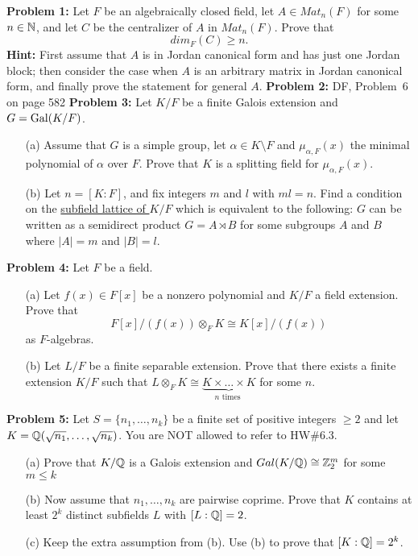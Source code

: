 \documentclass[12pt]{article}
\begin{document}
\skv
{\bf Problem 1:} Let $F$ be an algebraically closed field, let $A\in Mat_n (F)$
for some $n\in{\mathbb N}$, and let $C$ be the centralizer of $A$ in $Mat_n (F)$.
Prove that $$dim_F(C)\geq n.$$ {\bf Hint:} First assume that $A$ is in Jordan
canonical form and has just one Jordan block; then consider the case when
$A$ is an arbitrary matrix in Jordan canonical form, and finally prove
the statement for general $A$.
\skv
{\bf Problem 2:} DF, Problem~6 on page 582
\skv
{\bf Problem 3:} Let $K/F$ be a finite Galois extension and $G={\rm Gal}(K/F)$.
\begin{itemize}
\item[(a)] Assume  that $G$ is a simple group, let $\alpha\in K\setminus F$
and $\mu_{\alpha,F}(x)$ the minimal polynomial of $\alpha$ over $F$.
Prove that $K$ is a splitting field for $\mu_{\alpha,F}(x)$.

\item[(b)] Let $n=[K:F]$, and fix integers $m$ and $l$ with $ml=n$.
Find a condition on the \underline{subfield lattice of $K/F$} which is equivalent
to the following: $G$ can be written as a semidirect product $G=A\rtimes B$
for some subgroups $A$ and $B$ where $|A|=m$ and $|B|=l$.
\end{itemize}
\newpage
{\bf Problem 4:} Let $F$ be a field.
\begin{itemize}
\item[(a)] Let $f(x)\in F[x]$ be a nonzero polynomial and $K/F$ a field extension.
Prove that $$F[x]/(f(x))\otimes_F K\cong K[x]/(f(x))$$ as $F$-algebras.
\item[(b)] Let $L/F$ be a finite separable extension. Prove that
there exists a finite extension $K/F$ such that 
$L\otimes_F K\cong \underbrace{K\times\ldots\times K}_{n \mbox{ times }}$
for some $n$.
\end{itemize}
\skv
{\bf Problem 5:} \rm Let $S=\{n_1,\ldots, n_k\}$ be a finite set of positive integers $\geq 2$
and let $K={\mathbb Q}(\sqrt{n_1},\ldots, \sqrt{n_k})$. You are NOT allowed to refer to HW\#6.3.
\begin{itemize}
\item[(a)] Prove that $K/{\mathbb Q}$ is a Galois extension and $Gal(K/{\mathbb Q})\cong {\mathbb Z}_2^m$ for some $m\leq k$
\item[(b)] Now assume that $n_1,\ldots, n_k$ are pairwise coprime. Prove that $K$ contains at least $2^k$
distinct subfields $L$ with $[L:{\mathbb Q}]=2$. 
\item[(c)] Keep the extra assumption from (b). Use (b) to prove that $[K:{\mathbb Q}]=2^k$.  
\end{itemize}
\end{document}
